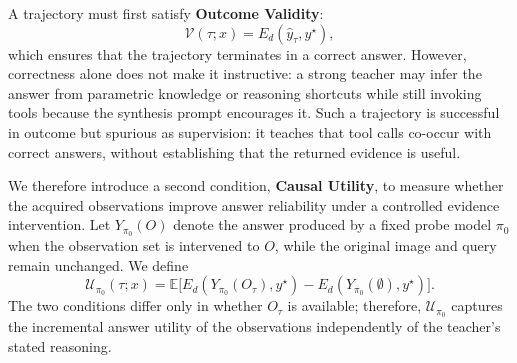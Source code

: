 A trajectory must first satisfy \textbf{Outcome Validity}:
\begin{equation}
\mathcal{V}(\tau;x)=E_d\left(\hat{y}_{\tau},y^\star\right),
\label{eq:outcome-validity}
\end{equation}
which ensures that the trajectory terminates in a correct answer.
However, correctness alone does not make it instructive: a strong teacher may infer the answer from parametric knowledge or reasoning shortcuts while still invoking tools because the synthesis prompt encourages it.
Such a trajectory is successful in outcome but spurious as supervision: it teaches that tool calls co-occur with correct answers, without establishing that the returned evidence is useful.

We therefore introduce a second condition, \textbf{Causal Utility}, to measure whether the acquired observations improve answer reliability under a controlled evidence intervention. 
Let $Y_{\pi_0}(O)$ denote the answer produced by a fixed probe model $\pi_0$ when the observation set is intervened to $O$, while the original image and query remain unchanged. 
We define
\begin{equation}
\mathcal{U}_{\pi_0}(\tau;x)=
\mathbb{E}\Big[
E_d\left(Y_{\pi_0}(O_{\tau}),y^\star\right) -
E_d\left(Y_{\pi_0}(\emptyset),y^\star\right)
\Big].
\label{eq:causal-utility}
\end{equation}
The two conditions differ only in whether $O_{\tau}$ is available; therefore, $\mathcal{U}_{\pi_0}$ captures the incremental answer utility of the observations independently of the teacher's stated reasoning.


